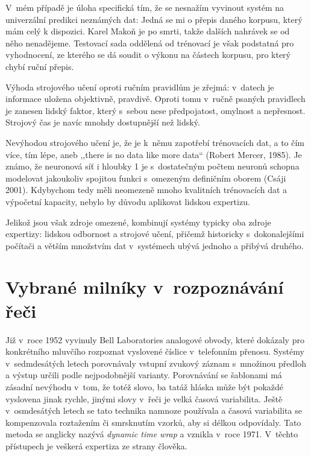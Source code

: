 V~mém případě je úloha specifická tím, že se nesnažím vyvinout systém na
univerzální predikci neznámých dat: Jedná se mi o přepis daného korpusu, který
mám celý k dispozici. Karel Makoň je po smrti, takže dalších nahrávek se od něho
nenadějeme. Testovací sada oddělená od trénovací je však podstatná pro
vyhodnocení, ze kterého se dá soudit o výkonu na částech korpusu, pro který
chybí ruční přepis.

Výhoda strojového učení oproti ručním pravidlům je zřejmá: v~datech je informace
uložena objektivně, pravdivě. Oproti tomu v~ručně psaných pravidlech je zanesen
lidský faktor, který s~sebou nese předpojatost, omylnost a nepřesnost. Strojový
čas je navíc mnohdy dostupnější než lidský.

Nevýhodou strojového učení je, že je k~němu zapotřebí trénovacích dat, a to čím
více, tím lépe, aneb ,,there is no data like more data`` (Robert Mercer, 1985). Je
známo, že neuronová síť i hloubky 1 je s~dostatečným počtem neuronů schopna
modelovat jakoukoliv spojitou funkci s~omezeným definičním oborem (Csáji
2001)\cite{csaji2001approximation}. Kdybychom tedy měli neomezeně mnoho
kvalitních trénovacích dat a výpočetní kapacity, nebylo by důvodu aplikovat
lidskou expertizu.

Jelikož jsou však zdroje omezené, kombinují systémy typicky oba zdroje
expertizy: lidskou odbornost a strojové učení, přičemž historicky
s~dokonalejšími počítači a větším množstvím dat v~systémech ubývá jednoho a
přibývá druhého.

\section{Vybrané milníky v~rozpoznávání řeči}

Již v~roce 1952 vyvinuly Bell Laboratories analogové obvody, které dokázaly pro
konkrétního mluvčího rozpoznat vyslovené číslice v~telefonním
přenosu.\cite{davis1952automatic}
Systémy v~sedmdesátých letech porovnávaly vstupní zvukový záznam
s~množinou předloh a výstup určili podle nejpodobnější
varianty\cite{huang2014historical}.
Porovnávání se šablonami má zásadní nevýhodu v~tom, že totéž slovo, ba tatáž
hláska může být pokaždé vyslovena jinak rychle, jinými slovy v~řeči je velká
časová variabilita. Ještě v~osmdesátých letech se tato technika namnoze
používala a časová variabilita se kompenzovala roztažením či smrsknutím vzorků,
aby si délkou odpovídaly. Tato metoda se anglicky nazývá \textit{dynamic time
wrap} a vznikla v~roce 1971\cite{sakoe1971chiba}.
V~těchto přístupech je veškerá expertiza ze strany člověka.

